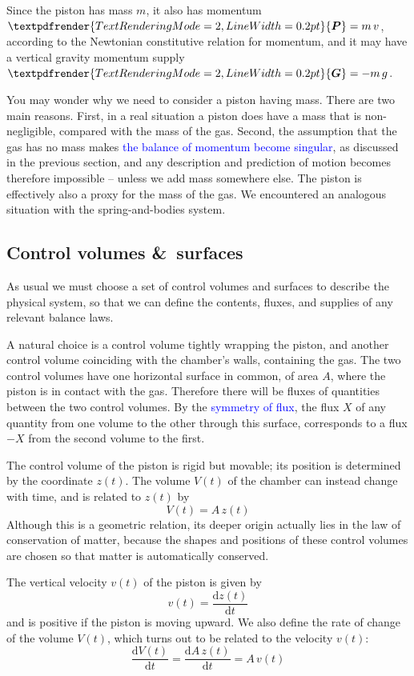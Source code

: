 \documentclass[a4paper,12pt,%
onecolumn,oneside,%
british%
]{memoir}
\newcommand*{\amp}{\&}
\renewcommand*{\bm}[1]{\textpdfrender{TextRenderingMode=2,LineWidth=0.2pt}{\boldsymbol{#1}}}
\newcommand*{\di}{\mathrm{d}}%
\renewcommand*{\|}[1][]{\nonscript\:#1\vert\nonscript\:\mathopen{}}
\newcommand*{\sect}{\S}%
\renewcommand*{\autoref}[2]{\sidepar{\vspace{-1ex}\footnotesize{\color{blue}\faIcon{%
angle-right%
}\enskip\sect~\ref{#1} page~\pageref{#1}}}\textcolor{blue}{#2}}
\newcommand*{\ym}{m}%
\newcommand*{\yP}{\bm{P}}
\newcommand*{\yG}{\bm{G}}
\begin{document}
Since the piston has mass $\ym$, it also has momentum $\yP=\ym\,v$, according to the Newtonian constitutive relation for momentum, and it may have a vertical gravity momentum supply $\yG = -\ym\,g$.

You may wonder why we need to consider a piston having mass. There are two main reasons. First, in a real situation a piston does have a mass that is non-negligible, compared with the mass of the gas. Second, the assumption that the gas has no mass makes \autoref{sec:further_idealgas}{the balance of momentum become singular}, as discussed in the previous section, and any description and prediction of motion becomes therefore impossible -- unless we add mass somewhere else. The piston is effectively also a proxy for the mass of the gas. We encountered an analogous situation with the spring-and-bodies system.

\subsection{Control volumes \amp\ surfaces}
\label{sec:idealgas_ex_control}

As usual we must choose a set of control volumes and surfaces to describe the physical system, so that we can define the contents, fluxes, and supplies of any relevant balance laws.

A natural choice is a control volume tightly wrapping the piston, and another control volume coinciding with the chamber's walls, containing the gas. The two control volumes have one horizontal surface in common, of area $A$, where the piston is in contact with the gas. Therefore there will be fluxes of quantities between the two control volumes. By the \autoref{def:symmetryflux}{symmetry of flux}, the flux $X$ of any quantity from one volume to the other through this surface, corresponds to a flux $-X$ from the second volume to the first.

The control volume of the piston is rigid but movable; its position is determined by the coordinate $z(t)$. The volume $V(t)$ of the chamber can instead change with time, and is related to $z(t)$ by
\begin{equation}\label{eq:Vz_gas}
  V(t) = A\,z(t)
\end{equation}
Although this is a geometric relation, its deeper origin actually lies in the law of conservation of matter, because the shapes and positions of these control volumes are chosen so that matter is automatically conserved.

The vertical velocity $v(t)$ of the piston is given by
\begin{equation*}
  v(t) = \frac{\di z(t)}{\di t}
\end{equation*}
and is positive if the piston is moving upward. We also define the rate of change of the volume $V(t)$, which turns out to be related to the velocity $v(t)$:
\begin{equation}\label{eq:Vv_gas}
  \frac{\di V(t)}{\di t} = \frac{\di A\, z(t)}{\di t} = A\,v(t)
\end{equation}
\end{document}
